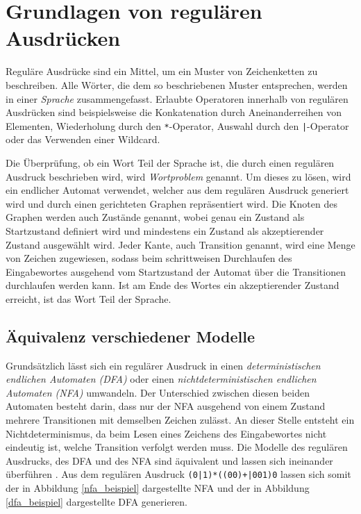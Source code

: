 \chapter{Grundlagen von regulären Ausdrücken}
\label{sec:regex}

Reguläre Ausdrücke sind ein Mittel, um ein Muster von Zeichenketten zu beschreiben.
Alle Wörter, die dem so beschriebenen Muster entsprechen, werden in einer \emph{Sprache} zusammengefasst.
Erlaubte Operatoren innerhalb von regulären Ausdrücken sind beispielsweise die Konkatenation durch Aneinanderreihen von Elementen, Wiederholung durch den \texttt{*}-Operator, Auswahl durch den \texttt{|}-Operator oder das Verwenden einer Wildcard.

Die Überprüfung, ob ein Wort Teil der Sprache ist, die durch einen regulären Ausdruck beschrieben wird, wird \emph{Wortproblem} genannt.
Um dieses zu lösen, wird ein endlicher Automat verwendet, welcher aus dem regulären Ausdruck generiert wird und durch einen gerichteten Graphen repräsentiert wird.
Die Knoten des Graphen werden auch Zustände genannt, wobei genau ein Zustand als Startzustand definiert wird und mindestens ein Zustand als akzeptierender Zustand ausgewählt wird.
Jeder Kante, auch Transition genannt, wird eine Menge von Zeichen zugewiesen, sodass beim schrittweisen Durchlaufen des Eingabewortes ausgehend vom Startzustand der Automat über die Transitionen durchlaufen werden kann.
Ist am Ende des Wortes ein akzeptierender Zustand erreicht, ist das Wort Teil der Sprache.

\section{Äquivalenz verschiedener Modelle}

Grundsätzlich lässt sich ein regulärer Ausdruck in einen \emph{deterministischen endlichen Automaten (DFA)} oder einen \emph{nichtdeterministischen endlichen Automaten (NFA)} umwandeln.
Der Unterschied zwischen diesen beiden Automaten besteht darin, dass nur der NFA ausgehend von einem Zustand mehrere Transitionen mit demselben Zeichen zulässt.
An dieser Stelle entsteht ein Nichtdeterminismus, da beim Lesen eines Zeichens des Eingabewortes nicht eindeutig ist, welche Transition verfolgt werden muss.
Die Modelle des regulären Ausdrucks, des DFA und des NFA sind äquivalent und lassen sich ineinander überführen \cite{Hopcroft2002}.
Aus dem regulären Ausdruck \texttt{(0|1)*((00)+|001)0} lassen sich somit der in Abbildung \ref{nfa_beispiel} dargestellte NFA und der in Abbildung \ref{dfa_beispiel} dargestellte DFA generieren.

